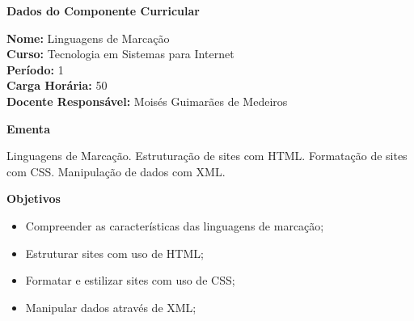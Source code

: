 

\begin{snugshade}\begin{center}\textbf{
    Dados do Componente Curricular
}\end{center}\end{snugshade}

\noindent \textbf{Nome:}                Linguagens de Marcação
\\        \textbf{Curso:}               Tecnologia em Sistemas para Internet
\\        \textbf{Período:}             \unit{1}{\degree}
\\        \textbf{Carga Horária:}       \unit{50}{\hour}
\\        \textbf{Docente Responsável:} Moisés Guimarães de Medeiros


\begin{snugshade}\begin{center}\textbf{
    Ementa
\vphantom{q}}\end{center}\end{snugshade}

\noindent
Linguagens de Marcação. Estruturação de sites com HTML. Formatação de sites com CSS. Manipulação de dados com XML.


\begin{snugshade}\begin{center}\textbf{
    Objetivos
}\end{center}\end{snugshade}

\begin{itemize}

\item Compreender as características das linguagens de marcação;

\item Estruturar sites com uso de HTML;

\item Formatar e estilizar sites com uso de CSS;

\item Manipular dados através de XML;

\end{itemize} 



